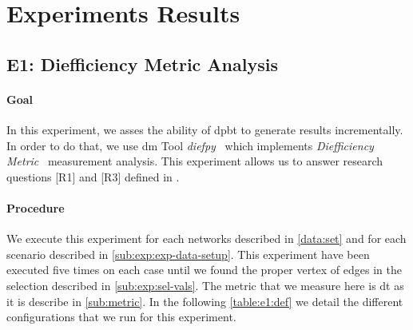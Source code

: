 \section{Experiments Results}\label{sec:exp:observed-results}
\subsection{E1: Diefficiency Metric Analysis}\label{sub:sec:exp-1} 
\paragraph{Goal} In this experiment, we asses the ability of \acrshort{dpbt} to generate results incrementally.
In order to do that, we use \acrfull{dm} Tool \emph{diefpy}~\cite{diefpy} which implements \emph{Diefficiency Metric}~\cite{diefpaper} measurement analysis.
This experiment allows us to answer research questions [R1] and [R3] defined in . 

\paragraph{Procedure} We execute this experiment for each networks described in \autoref{data:set} and for each scenario described in \autoref{sub:exp:exp-data-setup}.
This experiment have been executed five times on each case until we found the proper vertex of edges in the selection described in \autoref{sub:exp:sel-vals}.
The metric that we measure here is \acrfull{dt} as it is describe in \autoref{sub:metric}.
In the following \autoref{table:e1:def} we detail the different configurations that we run for this experiment.

